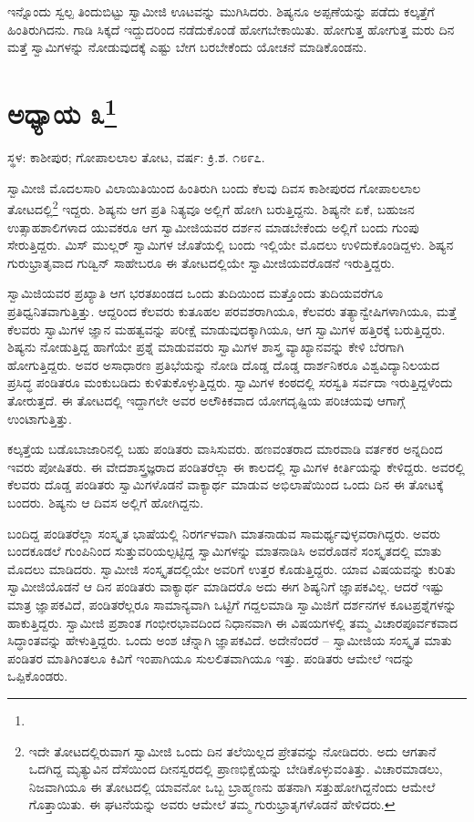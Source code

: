 ಇನ್ನೊಂದು ಸ್ವಲ್ಪ ತಿಂದುಬಿಟ್ಟು ಸ್ವಾಮೀಜಿ ಊಟವನ್ನು ಮುಗಿಸಿದರು. ಶಿಷ್ಯನೂ ಅಪ್ಪಣೆಯನ್ನು ಪಡೆದು ಕಲ್ಕತ್ತೆಗೆ ಹಿಂತಿರುಗಿದನು. ಗಾಡಿ ಸಿಕ್ಕದೆ ಇದ್ದುದರಿಂದ ನಡೆದುಕೊಂಡೆ ಹೋಗಬೇಕಾಯಿತು. ಹೋಗುತ್ತ ಹೋಗುತ್ತ ಮರು ದಿನ ಮತ್ತೆ ಸ್ವಾಮಿಗಳನ್ನು ನೋಡುವುದಕ್ಕೆ ಎಷ್ಟು ಬೇಗ ಬರಬೇಕೆಂದು ಯೋಚನೆ ಮಾಡಿಕೊಂಡನು.

\newpage

\chapter[ಅಧ್ಯಾಯ ೩]{ಅಧ್ಯಾಯ ೩\protect\footnote{}}

\centerline{ಸ್ಥಳ: ಕಾಶೀಪುರ; ಗೋಪಾಲಲಾಲ ತೋಟ, ವರ್ಷ: ಕ್ರಿ.ಶ. ೧೮೯೭.}

ಸ್ವಾಮೀಜಿ ಮೊದಲಸಾರಿ ವಿಲಾಯಿತಿಯಿಂದ ಹಿಂತಿರುಗಿ ಬಂದು ಕೆಲವು ದಿವಸ ಕಾಶೀಪುರದ ಗೋಪಾಲಲಾಲ ತೋಟದಲ್ಲಿ\footnote{ಇದೇ ತೋಟದಲ್ಲಿರುವಾಗ ಸ್ವಾಮೀಜಿ ಒಂದು ದಿನ ತಲೆಯಿಲ್ಲದ ಪ್ರೇತವನ್ನು ನೋಡಿದರು. ಅದು ಆಗತಾನೆ ಒದಗಿದ್ದ ಮೃತ್ಯುವಿನ ದೆಸೆಯಿಂದ ದೀನಸ್ವರದಲ್ಲಿ ಪ್ರಾಣಭಿಕ್ಷೆಯನ್ನು ಬೇಡಿಕೊಳ್ಳುವಂತಿತ್ತು. ವಿಚಾರಮಾಡಲು, ನಿಜವಾಗಿಯೂ ಈ ತೋಟದಲ್ಲಿ ಯಾವನೋ ಒಬ್ಬ ಬ್ರಾಹ್ಮಣನು ಹತನಾಗಿ ಸತ್ತುಹೋಗಿದ್ದನೆಂದು ಆಮೇಲೆ ಗೊತ್ತಾಯಿತು. ಈ ಘಟನೆಯನ್ನು ಅವರು ಆಮೇಲೆ ತಮ್ಮ ಗುರುಭ್ರಾತೃಗಳೊಡನೆ ಹೇಳಿದರು.} ಇದ್ದರು. ಶಿಷ್ಯನು ಆಗ ಪ್ರತಿ ನಿತ್ಯವೂ ಅಲ್ಲಿಗೆ ಹೋಗಿ ಬರುತ್ತಿದ್ದನು. ಶಿಷ್ಯನೇ ಏಕೆ, ಬಹುಜನ ಉತ್ಸಾಹಶಾಲಿಗಳಾದ ಯುವಕರೂ ಆಗ ಸ್ವಾಮೀಜಿಯವರ ದರ್ಶನ ಮಾಡಬೇಕೆಂದು ಅಲ್ಲಿಗೆ ಬಂದು ಗುಂಪು ಸೇರುತ್ತಿದ್ದರು. ಮಿಸ್ ಮುಲ್ಲರ್ ಸ್ವಾಮಿಗಳ ಜೊತೆಯಲ್ಲಿ ಬಂದು ಇಲ್ಲಿಯೇ ಮೊದಲು ಉಳಿದುಕೊಂಡಿದ್ದಳು. ಶಿಷ್ಯನ ಗುರುಭ್ರಾತೃವಾದ ಗುಡ್ವಿನ್ ಸಾಹೇಬರೂ ಈ ತೋಟದಲ್ಲಿಯೇ ಸ್ವಾಮೀಜಿಯವರೊಡನೆ ಇರುತ್ತಿದ್ದರು.

ಸ್ವಾಮಿಜಿಯವರ ಪ್ರಖ್ಯಾತಿ ಆಗ ಭರತಖಂಡದ ಒಂದು ತುದಿಯಿಂದ ಮತ್ತೊಂದು ತುದಿಯವರೆಗೂ ಪ್ರತಿಧ್ವನಿತವಾಗುತ್ತಿತ್ತು. ಆದ್ದರಿಂದ ಕೆಲವರು ಕುತೂಹಲ ಪರವಶರಾಗಿಯೂ, ಕೆಲವರು ತತ್ಯಾನ್ವೇಷಿಗಳಾಗಿಯೂ, ಮತ್ತೆ ಕೆಲವರು ಸ್ವಾಮಿಗಳ ಜ್ಞಾನ ಮಹತ್ವವನ್ನು ಪರೀಕ್ಷೆ ಮಾಡುವುದಕ್ಕಾಗಿಯೂ, ಆಗ ಸ್ವಾಮಿಗಳ ಹತ್ತಿರಕ್ಕೆ ಬರುತ್ತಿದ್ದರು. ಶಿಷ್ಯನು ನೋಡುತ್ತಿದ್ದ ಹಾಗೆಯೇ ಪ್ರಶ್ನೆ ಮಾಡುವವರು ಸ್ವಾಮಿಗಳ ಶಾಸ್ತ್ರ ವ್ಯಾಖ್ಯಾನವನ್ನು ಕೇಳಿ ಬೆರಗಾಗಿ ಹೋಗುತ್ತಿದ್ದರು. ಅವರ ಅಸಾಧಾರಣ ಪ್ರತಿಭೆಯನ್ನು ನೋಡಿ ದೊಡ್ಡ ದೊಡ್ಡ ದಾರ್ಶನಿಕರೂ ವಿಶ್ವವಿದ್ಯಾನಿಲಯದ ಪ್ರಸಿದ್ಧ ಪಂಡಿತರೂ ಮಂಕುಬಡಿದು ಕುಳಿತುಕೊಳ್ಳುತ್ತಿದ್ದರು. ಸ್ವಾಮಿಗಳ ಕಂಠದಲ್ಲಿ ಸರಸ್ವತಿ ಸರ್ವದಾ ಇರುತ್ತಿದ್ದಳೆಂದು ತೋರುತ್ತದೆ. ಈ ತೋಟದಲ್ಲಿ ಇದ್ದಾಗಲೇ ಅವರ ಅಲೌಕಿಕವಾದ ಯೋಗದೃಷ್ಟಿಯ ಪರಿಚಯವು ಆಗಾಗ್ಗೆ ಉಂಟಾಗುತ್ತಿತ್ತು.

ಕಲ್ಕತ್ತೆಯ ಬಡೊಬಾಜಾರಿನಲ್ಲಿ ಬಹು ಪಂಡಿತರು ವಾಸಿಸುವರು. ಹಣವಂತರಾದ ಮಾರವಾಡಿ ವರ್ತಕರ ಅನ್ನದಿಂದ ಇವರು ಪೋಷಿತರು. ಈ ವೇದಶಾಸ್ತ್ರಜ್ಞರಾದ ಪಂಡಿತರೆಲ್ಲಾ ಈ ಕಾಲದಲ್ಲಿ ಸ್ವಾಮಿಗಳ ಕೀರ್ತಿಯನ್ನು ಕೇಳಿದ್ದರು. ಅವರಲ್ಲಿ ಕೆಲವರು ದೊಡ್ಡ ಪಂಡಿತರು ಸ್ವಾಮಿಗಳೊಡನೆ ವಾಕ್ಯಾರ್ಥ ಮಾಡುವ ಅಭಿಲಾಷೆಯಿಂದ ಒಂದು ದಿನ ಈ ತೋಟಕ್ಕೆ ಬಂದರು. ಶಿಷ್ಯನು ಆ ದಿವಸ ಅಲ್ಲಿಗೆ ಹೋಗಿದ್ದನು.

ಬಂದಿದ್ದ ಪಂಡಿತರೆಲ್ಲಾ ಸಂಸ್ಕೃತ ಭಾಷೆಯಲ್ಲಿ ನಿರರ್ಗಳವಾಗಿ ಮಾತನಾಡುವ ಸಾಮರ್ಥ್ಯವುಳ್ಳವರಾಗಿದ್ದರು. ಅವರು ಬಂದಕೂಡಲೆ ಗುಂಪಿನಿಂದ ಸುತ್ತುವರಿಯಲ್ಪಟ್ಟಿದ್ದ ಸ್ವಾಮಿಗಳನ್ನು ಮಾತನಾಡಿಸಿ ಅವರೊಡನೆ ಸಂಸ್ಕೃತದಲ್ಲಿ ಮಾತು ಮೊದಲು ಮಾಡಿದರು. ಸ್ವಾಮೀಜಿ ಸಂಸ್ಕೃತದಲ್ಲಿಯೇ ಅವರಿಗೆ ಉತ್ತರ ಕೊಡುತ್ತಿದ್ದರು. ಯಾವ ವಿಷಯವನ್ನು ಕುರಿತು ಸ್ವಾಮೀಜಿಯೊಡನೆ ಆ ದಿನ ಪಂಡಿತರು ವಾಕ್ಯಾರ್ಥ ಮಾಡಿದರೊ ಅದು ಈಗ ಶಿಷ್ಯನಿಗೆ ಜ್ಞಾಪಕವಿಲ್ಲ. ಆದರೆ ಇಷ್ಟು ಮಾತ್ರ ಜ್ಞಾಪಕವಿದೆ, ಪಂಡಿತರೆಲ್ಲರೂ ಸಾಮಾನ್ಯವಾಗಿ ಒಟ್ಟಿಗೆ ಗದ್ದಲಮಾಡಿ ಸ್ವಾಮಿಜಿಗೆ ದರ್ಶನಗಳ ಕೂಟಪ್ರಶ್ನೆಗಳನ್ನು ಹಾಕುತ್ತಿದ್ದರು. ಸ್ವಾಮೀಜಿ ಪ್ರಶಾಂತ ಗಂಭೀರಭಾವದಿಂದ ನಿಧಾನವಾಗಿ ಈ ವಿಷಯಗಳಲ್ಲಿ ತಮ್ಮ ವಿಚಾರಪೂರ್ವಕವಾದ ಸಿದ್ಧಾಂತವನ್ನು ಹೇಳುತ್ತಿದ್ದರು. ಒಂದು ಅಂಶ ಚೆನ್ನಾಗಿ ಜ್ಞಾಪಕವಿದೆ. ಅದೇನೆಂದರೆ – ಸ್ವಾಮೀಜಿಯ ಸಂಸ್ಕೃತ ಮಾತು ಪಂಡಿತರ ಮಾತಿಗಿಂತಲೂ ಕಿವಿಗೆ ಇಂಪಾಗಿಯೂ ಸುಲಲಿತವಾಗಿಯೂ ಇತ್ತು. ಪಂಡಿತರು ಆಮೇಲೆ ಇದನ್ನು ಒಪ್ಪಿಕೊಂಡರು.

